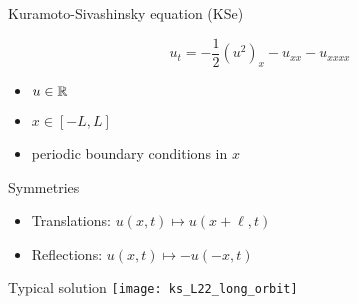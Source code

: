 \begin{frame}{Kuramoto-Sivashinsky equation (KSe)}
 \begin{block}{}
  \[
	u_t =  -{\textstyle\frac{1}{2}}(u^2)_x-u_{xx}-u_{xxxx}
  \]
  \begin{itemize}
    \item $u\in\mathbb{R}^{}$
	\item $x\in[-L,L]$
	\item periodic boundary conditions in $x$
  \end{itemize}
 \end{block}
  \begin{block}{Symmetries}
    \begin{itemize}
	  \item Translations: $u(x,t) \mapsto u(x+\ell,t)$
	  \item Reflections: $u(x,t) \mapsto -u(-x,t)$
    \end{itemize}

  \end{block}
\end{frame}

%  

\begin{frame}{Typical solution}
  \centering
  \texttt{[image: ks\_L22\_long\_orbit]}

\end{frame}


